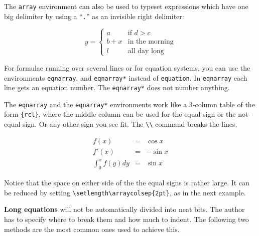 The \texttt{array} environment can also be used to typeset expressions which have one
big delimiter by using a ``\verb|.|'' as an invisible right 
delimiter:

\begin{singlespace}
\begin{example}
\begin{displaymath}
y = \left\{ \begin{array}{ll}
 a & \textrm{if $d>c$}\\
 b+x & \textrm{in the morning}\\
 l & \textrm{all day long}
  \end{array} \right.
\end{displaymath}
\end{example}
\end{singlespace}


For formulae running over several lines or for equation systems,
you can use the environments \texttt{eqnarray}, and \verb|eqnarray*|
instead of \texttt{equation}. In \texttt{eqnarray} each line gets an
equation number. The \verb|eqnarray*| does not number anything.

The \texttt{eqnarray} and the \verb|eqnarray*| environments work like
a 3-column table of the form \verb|{rcl}|, where the middle column can
be used for the equal sign or the not-equal sign. Or any other sign
you see fit. The \verb|\\| command breaks the lines.

\begin{singlespace}
\begin{example}
\begin{eqnarray}
f(x) & = & \cos x     \\
f'(x) & = & -\sin x   \\
\int_{0}^{x} f(y)dy &
 = & \sin x
\end{eqnarray}
\end{example}
\end{singlespace}

\noindent Notice that the space on either side of the 
the equal signs is rather large. It can be reduced by setting
\verb|\setlength\arraycolsep{2pt}|, as in the next example.

 \textbf{Long equations} will not be
automatically divided into neat bits.  The author has to specify
where to break them and how much to indent. The following two methods
are the most common ones used to achieve this.

